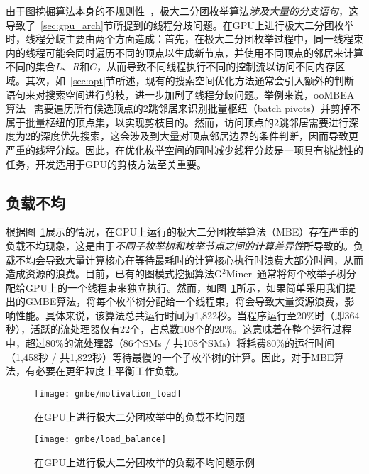 由于图挖掘算法本身的不规则性~\cite{Irregularity12}，极大二分团枚举算法\emph{涉及大量的分支语句}，这导致了~\ref{sec:gpu_arch}节所提到的线程分歧问题。在GPU上进行极大二分团枚举时，线程分歧主要由两个方面造成：首先，在极大二分团枚举过程中，同一线程束内的线程可能会同时遍历不同的顶点以生成新节点，并使用不同顶点的邻居来计算不同的集合$L$、$R$和$C$，从而导致不同线程执行不同的控制流以访问不同内存区域。其次，如~\ref{sec:opt}节所述，现有的搜索空间优化方法通常会引入额外的判断语句来对搜索空间进行剪枝，进一步加剧了线程分歧问题。举例来说，ooMBEA算法~\cite{ooMBE22} 需要遍历所有候选顶点的2跳邻居来识别批量枢纽（batch pivots）并剪掉不属于批量枢纽的顶点集，以实现剪枝目的。然而，访问顶点的2跳邻居需要进行深度为2的深度优先搜索，这会涉及到大量对顶点邻居边界的条件判断，因而导致更严重的线程分歧。因此，在优化枚举空间的同时减少线程分歧是一项具有挑战性的任务，开发适用于GPU的剪枝方法至关重要。

\subsection{负载不均}

根据图~\ref{fig:gmbe_load_reason}展示的情况，在GPU上运行的极大二分团枚举算法（MBE）存在严重的负载不均现象，这是由于\emph{不同子枚举树和枚举节点之间的计算差异性}所导致的。负载不均会导致大量计算核心在等待最耗时的计算核心执行时浪费大部分时间，从而造成资源的浪费。目前，已有的图模式挖掘算法G$^2$Miner~\cite{g2miner22}通常将每个枚举子树分配给GPU上的一个线程束来独立执行。然而，如图~\ref{fig:gmbe_load_reason}所示，如果简单采用我们提出的GMBE算法，将每个枚举树分配给一个线程束，将会导致大量资源浪费，影响性能。具体来说，该算法总共运行时间为1,822秒。当程序运行至20\%时（即364秒），活跃的流处理器仅有22个，占总数108个的20\%。这意味着在整个运行过程中，超过80\%的流处理器（86个SMs / 共108个SMs）将耗费80\%的运行时间（1,458秒 / 共1,822秒）等待最慢的一个子枚举树的计算。因此，对于MBE算法，有必要在更细粒度上平衡工作负载。

\begin{figure} [H]
  \center
    \vspace{0.1in}
		\texttt{[image: gmbe/motivation\_load]}
    \vspace{0.1in}
	\caption{在GPU上进行极大二分团枚举中的负载不均问题}
	\label{fig:gmbe_load_reason}
\end{figure}

\begin{figure} [H]
  \center
		\texttt{[image: gmbe/load\_balance]}
    \vspace{0.1in}
	\caption{在GPU上进行极大二分团枚举的负载不均问题示例}
	\label{fig:gmbe_load_example}
\end{figure}


